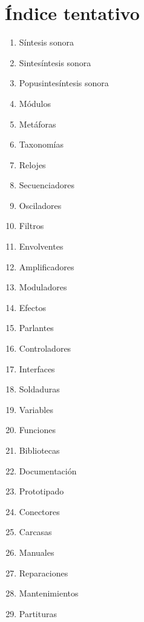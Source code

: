 \documentclass[../proyecto.tex]{subfiles}
\begin{document}
\section{Índice tentativo}


\begin{enumerate}
    \item Síntesis sonora
    \item Sintesíntesis sonora
    \item Popusintesíntesis sonora
    \item Módulos
    \item Metáforas
    \item Taxonomías
    \item Relojes
    \item Secuenciadores
    \item Osciladores
    \item Filtros
    \item Envolventes
    \item Amplificadores
    \item Moduladores
    \item Efectos
    \item Parlantes
    \item Controladores
    \item Interfaces
    \item Soldaduras
    \item Variables
    \item Funciones
    \item Bibliotecas
    \item Documentación
    \item Prototipado
    \item Conectores
    \item Carcasas
    \item Manuales
    \item Reparaciones
    \item Mantenimientos
    \item Partituras
\end{enumerate}
\end{document}
